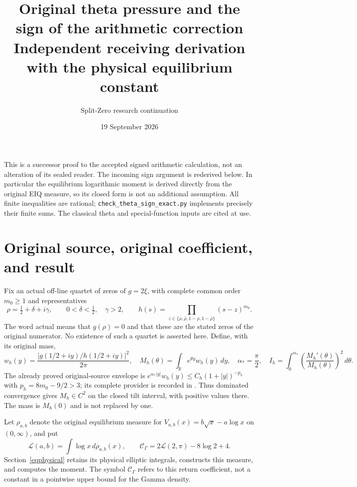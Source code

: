 \documentclass[11pt]{article}
\title{Original theta pressure and the sign of the arithmetic correction\\
Independent receiving derivation with the physical equilibrium constant}
\author{Split-Zero research continuation}
\date{19 September 2026}
\newcommand{\dd}{\,d}
\begin{document}
\maketitle

This is a successor proof to the accepted signed arithmetic calculation,
not an alteration of its sealed reader. The incoming sign argument is
rederived below. In particular the equilibrium logarithmic moment is
derived directly from the original EIQ measure, so its closed form is
not an additional assumption. All finite inequalities are rational;
\texttt{check\_theta\_sign\_exact.py} implements precisely their finite sums.
The classical theta and special-function inputs are cited at use.

\section{Original source, original coefficient, and result}
Fix an actual off-line quartet of zeros of $g=2\xi$, with complete common
order $m_0\geq1$ and representatives
\begin{equation}\tag{TS1}
 \rho=\tfrac12+\delta+i\gamma,\qquad 0<\delta<\tfrac12,\quad\gamma>2,
 \qquad
 h(s)=\prod_{z\in\{\rho,\bar\rho,1-\rho,1-\bar\rho\}}(s-z)^{m_0}.
\end{equation}
The word actual means that $g(\rho)=0$ and that these are the stated
zeros of the original numerator. No existence of such a quartet is
asserted here. Define, with its original mass,
\begin{equation}\tag{TS2}
 w_h(y)=\frac{|g(1/2+iy)/h(1/2+iy)|^2}{2\pi},\quad
 M_h(\theta)=\int_{\mathbb R}e^{\theta y}w_h(y)\dd y,\quad
 \alpha_*=\frac\pi2,\quad
 I_h=\int_0^{\alpha_*}\left(\frac{M_h'(\theta)}{M_h(\theta)}\right)^2\dd\theta.
\end{equation}
The already proved original-source envelope is
$e^{\alpha_*|y|}w_h(y)\leq C_h(1+|y|)^{-p_h}$ with
$p_h=8m_0-9/2>3$; its complete provider is recorded in
\cite{SBV}. Thus dominated convergence gives $M_h\in C^2$
on the closed tilt interval, with positive values there. The mass is
$M_h(0)$ and is not replaced by one.

Let $\rho_{a,b}$ denote the original equilibrium measure for
$V_{a,b}(x)=b\sqrt x-a\log x$ on $(0,\infty)$, and put
\begin{equation}\tag{TS3}
 \mathcal L(a,b)=\int\log x\dd\rho_{a,b}(x),\qquad
 \mathcal C_\Gamma=2\mathcal L(2,\pi)-8\log2+4.
\end{equation}
Section~\ref{eqphysical} retains its physical elliptic integrals,
constructs this measure, and computes the moment. The symbol
$\mathcal C_\Gamma$ refers to this return coefficient, not a constant
in a pointwise upper bound for the Gamma density.
\end{document}
